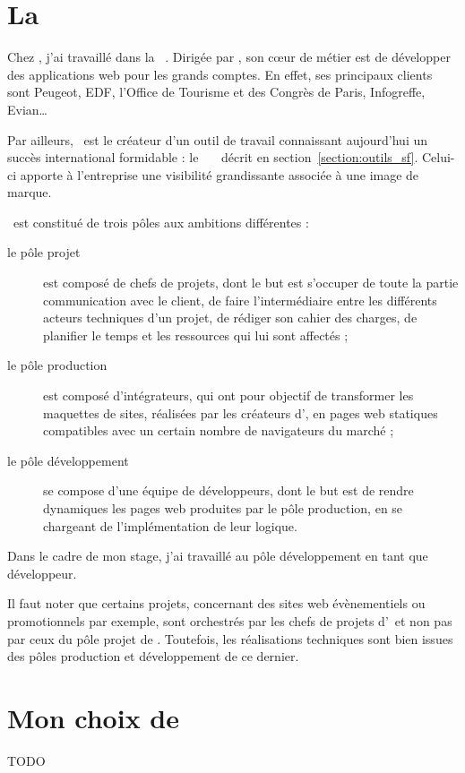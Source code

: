 \section{La \abufull\ \asl}

Chez \asensio, j'ai travaillé dans la \abufull\ \asl. Dirigée par \apotencier, son cœur de métier est de développer des applications web pour les grands comptes. En effet, ses principaux clients sont Peugeot, EDF, l'Office de Tourisme et des Congrès de Paris, Infogreffe, Evian\dots

Par ailleurs, \asl\ est le créateur d'un outil de travail connaissant aujourd'hui un succès international formidable : le \afm\ \aphp\ \asf\ décrit en section~\ref{section:outils_sf}. Celui-ci apporte à l'entreprise une visibilité grandissante associée à une image de marque. 

\asl\ est constitué de trois pôles aux ambitions différentes :

\begin{description}
	\item[le pôle projet] est composé de chefs de projets, dont le but est s'occuper de toute la partie communication avec le client, de faire l'intermédiaire entre les différents acteurs techniques d'un projet, de rédiger son cahier des charges, de planifier le temps et les ressources qui lui sont affectés ;
	\item[le pôle production] est composé d'intégrateurs, qui ont pour objectif de transformer les maquettes de sites, réalisées par les créateurs d'\aes, en pages web statiques compatibles avec un certain nombre de navigateurs du marché ;
	\item[le pôle développement] se compose d'une équipe de développeurs, dont le but est de rendre dynamiques les pages web produites par le pôle production, en se chargeant de l'implémentation de leur logique.
\end{description}

Dans le cadre de mon stage, j'ai travaillé au pôle développement en tant que développeur.

Il faut noter que certains projets, concernant des sites web évènementiels ou promotionnels par exemple, sont orchestrés par les chefs de projets d'\aes\ et non pas par ceux du pôle projet de \asl. Toutefois, les réalisations techniques sont bien issues des pôles production et développement de ce dernier.


\section{Mon choix de \asl}

TODO
